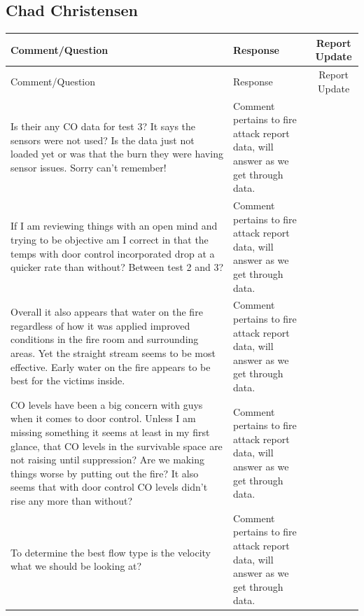 \documentclass[12pt,oneside]{book}
\begin{document}
\begin{landscape}

\pagestyle{empty}
\section{Chad Christensen}
\begin{longtable}{|L{4in}|L{3.75in}|c|}

		\hline
		Comment/Question & Response & Report Update \\ 
		\toprule[1.0pt] \endfirsthead
		\hline
		Comment/Question & Response & Report Update \\ 
		\toprule[1.0pt] \endhead
		\hline
		Is their any CO data for test 3? It says the sensors were not used? Is the data just not loaded yet or was that the burn they were having sensor issues. Sorry can't remember! &
		Comment pertains to fire attack report data, will answer as we get through data. & \\
		
		\hline
		If I am reviewing things with an open mind and trying to be objective am I correct in that the temps with door control incorporated drop at a quicker rate than without? Between test 2 and 3? & 
		Comment pertains to fire attack report data, will answer as we get through data. & \\

		\hline
		Overall it also appears that water on the fire regardless of how it was applied improved conditions in the fire room and surrounding areas. Yet the straight stream seems to be most effective. Early water on the fire appears to be best for the victims inside. &
		Comment pertains to fire attack report data, will answer as we get through data. & \\

		\hline
		CO levels have been a big concern with guys when it comes to door control. Unless I am missing something it seems at least in my first glance, that CO levels in the survivable space are not raising until suppression? Are we making things worse by putting out the fire? It also seems that with door control CO levels didn't rise any more than without? & 
		Comment pertains to fire attack report data, will answer as we get through data. & \\

		\hline
		To determine the best flow type is the velocity what we should be looking at? & 
		Comment pertains to fire attack report data, will answer as we get through data. & \\


\end{longtable}
\end{landscape}
\end{document}

